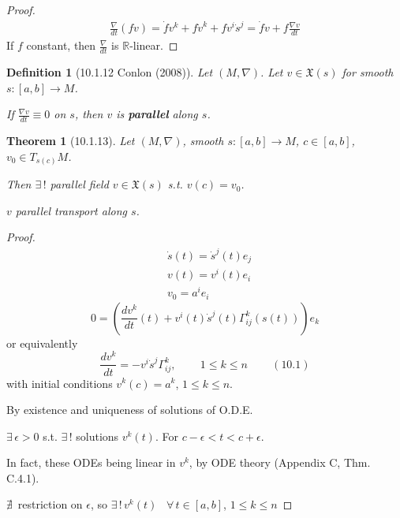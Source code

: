 \documentclass[10pt]{amsart}
\newtheorem{theorem}{Theorem}
\newtheorem{definition}{Definition}
\begin{document}
\begin{multicols*}{2}
\begin{proof}
	\[
	\begin{gathered}
	\frac{\nabla}{dt}(fv) = \dot{f}v^k + f\dot{v}^k + fv^i \dot{s}^j = \dot{f}v + f\frac{ \nabla v}{dt}
	\end{gathered}
	\]
If $f$ constant, then $\frac{\nabla}{dt}$ is $\mathbb{R}$-linear.  	

\end{proof}

\begin{definition}[10.1.12 Conlon (2008)\cite{Conl2008}]
	Let $(M,\nabla)$.  Let $v\in\mathfrak{X}(s)$ for smooth $s:[a,b] \to M$.  

If $\frac{\nabla v}{dt} \equiv 0$ on $s$, then $v$ is \textbf{parallel } along $s$.  
\end{definition}

\begin{theorem}[10.1.13] 
Let $(M,\nabla)$, smooth $s:[a,b]\to M$, $c\in [a,b]$, $v_0 \in T_{s(c)}M$.  

Then $\exists \, !$ parallel field $v\in \mathfrak{X}(s)$ s.t. $v(c) = v_0$.  

$v$ parallel transport along $s$.  
\end{theorem}
\begin{proof}
	\[
\begin{aligned}
	& \dot{s}(t) = \dot{s}^j(t) e_j \\ 
	&  v(t) = v^i(t) e_i  \\
& v_0 = a^i e_i
\end{aligned}
\]
\[
0 = \left( \frac{dv^k}{dt}(t) + v^i(t) \dot{s}^j(t) \Gamma^k_{ij}(s(t)) \right) e_k
\]
or equivalently
\begin{equation}
	\frac{dv^k}{dt} = - v^i \dot{s}^j \Gamma^k_{ij} , \qquad \, 1\leq k \leq n \qquad \, (10.1)
\end{equation}
with initial conditions $v^k(c) = a^k$, $1\leq k \leq n$.  

By existence and uniqueness of solutions of O.D.E.  

$\exists \, \epsilon > 0$ s.t. $\exists \, !$ solutions $v^k(t)$.  For $c-\epsilon < t < c+\epsilon$.  

In fact, these ODEs being linear in $v^k$,  by ODE theory (Appendix C, Thm. C.4.1).  

$\nexists \, $ restriction on $\epsilon$, so $\exists \, ! \, v^k(t)$ \, $\forall \, t \in [a,b]$, $1\leq k \leq n$  

\end{proof}





\end{multicols*}
\end{document}
